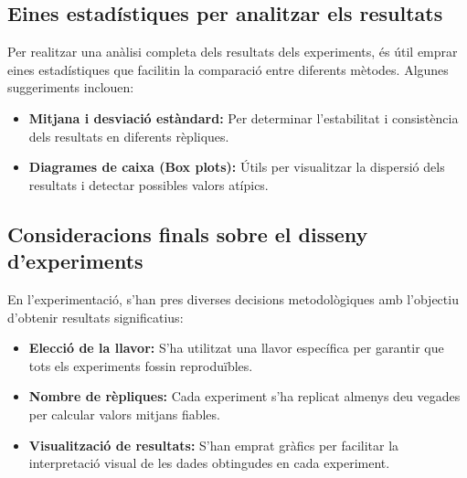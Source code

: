 \documentclass[a4paper]{article}
\begin{document}
	\subsection*{Eines estadístiques per analitzar els resultats}
	
	Per realitzar una anàlisi completa dels resultats dels experiments, és útil emprar eines estadístiques que facilitin la comparació entre diferents mètodes. Algunes suggeriments inclouen:
	
	\begin{itemize}
		\item \textbf{Mitjana i desviació estàndard:} Per determinar l'estabilitat i consistència dels resultats en diferents rèpliques.
		\item \textbf{Diagrames de caixa (Box plots):} Útils per visualitzar la dispersió dels resultats i detectar possibles valors atípics.
	\end{itemize}
	
	\subsection*{Consideracions finals sobre el disseny d'experiments}
	
	En l'experimentació, s'han pres diverses decisions metodològiques amb l'objectiu d'obtenir resultats significatius:
	
	\begin{itemize}
		\item \textbf{Elecció de la llavor:} S'ha utilitzat una llavor específica per garantir que tots els experiments fossin reproduïbles.
		\item \textbf{Nombre de rèpliques:} Cada experiment s'ha replicat almenys deu vegades per calcular valors mitjans fiables.
		\item \textbf{Visualització de resultats:} S'han emprat gràfics per facilitar la interpretació visual de les dades obtingudes en cada experiment.
	\end{itemize}
	
\end{document}

